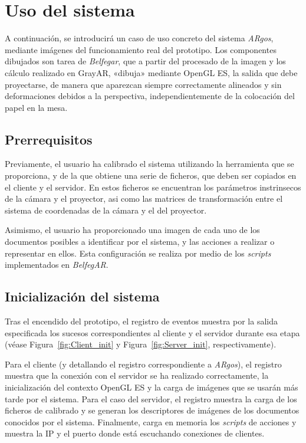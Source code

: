 \section{Uso del sistema}

A continuación, se introducirá un caso de uso concreto del sistema \textit{ARgos}, mediante imágenes del funcionamiento real del prototipo. Los componentes dibujados son tarea de \textit{Belfegar}, que a partir del procesado de la imagen y los cálculo realizado en GrayAR, «dibuja» mediante OpenGL ES, la salida que debe proyectarse, de manera que aparezcan siempre correctamente alineados y sin deformaciones debidos a la  perspectiva, independientemente de la colocación del papel en la mesa.

\subsection{Prerrequisitos}
Previamente, el usuario ha calibrado el sistema utilizando la herramienta que se proporciona, y de la que obtiene una serie de ficheros, que deben ser copiados en el cliente y el servidor. En estos ficheros se encuentran los parámetros instrinsecos de la cámara y el proyector, asi como las matrices de transformación entre el sistema de coordenadas de la cámara y el del proyector.

Asimismo, el usuario ha proporcionado una imagen de cada uno de los documentos posibles a identificar por el sistema, y las acciones a realizar o representar en ellos. Esta configuración se realiza por medio de los \textit{scripts} implementados en \textit{BelfegAR}.
 
\subsection{Inicialización del sistema}
Tras el encendido del prototipo, el registro de eventos muestra por la salida especificada los sucesos correspondientes al cliente y el servidor durante esa etapa (véase Figura~\ref{fig:Client_init} y
Figura~\ref{fig:Server_init}, respectivamente). 

Para el cliente (y detallando el registro correspondiente a \textit{ARgos}), el registro muestra que la conexión con el servidor se ha realizado correctamente, la inicialización del contexto OpenGL ES y la carga de imágenes que se usarán más tarde por el sistema. Para el caso del servidor, el registro muestra la carga de los ficheros de calibrado y se generan los descriptores de imágenes de los documentos conocidos por el sistema. Finalmente, carga en memoria los \textit{scripts} de acciones y muestra la IP y el puerto donde está escuchando conexiones de clientes.


